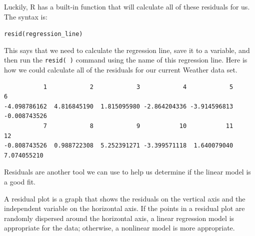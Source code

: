 \documentclass[
  letterpaper,
  DIV=11,
  numbers=noendperiod]{scrreprt}
\newenvironment{Shaded}{\begin{snugshade}}{\end{snugshade}}
\newcommand{\CommentTok}[1]{\textcolor[rgb]{0.37,0.37,0.37}{#1}}
\newcommand{\DecValTok}[1]{\textcolor[rgb]{0.68,0.00,0.00}{#1}}
\newcommand{\FunctionTok}[1]{\textcolor[rgb]{0.28,0.35,0.67}{#1}}
\newcommand{\NormalTok}[1]{\textcolor[rgb]{0.00,0.23,0.31}{#1}}
\newcommand{\OtherTok}[1]{\textcolor[rgb]{0.00,0.23,0.31}{#1}}
\newcommand{\SpecialCharTok}[1]{\textcolor[rgb]{0.37,0.37,0.37}{#1}}
\begin{document}
Luckily, R has a built-in function that will calculate all of these
residuals for us. The syntax is:

\texttt{resid(regression\_line)}

This says that we need to calculate the regression line, save it to a
variable, and then run the \texttt{resid(\ )} command using the name of
this regression line. Here is how we could calculate all of the
residuals for our current Weather data set.

\begin{Shaded}
\end{Shaded}

\begin{verbatim}
           1            2            3            4            5            6 
-4.098786162  4.816845190  1.815095980 -2.864204336 -3.914596813 -0.008743526 
           7            8            9           10           11           12 
-0.808743526  0.988722308  5.252391271 -3.399571118  1.640079040  7.074055210 
\end{verbatim}

Residuals are another tool we can use to help us determine if the linear
model is a good fit.

A residual plot is a graph that shows the residuals on the vertical axis
and the independent variable on the horizontal axis. If the points in a
residual plot are randomly dispersed around the horizontal axis, a
linear regression model is appropriate for the data; otherwise, a
nonlinear model is more appropriate.
\end{document}
